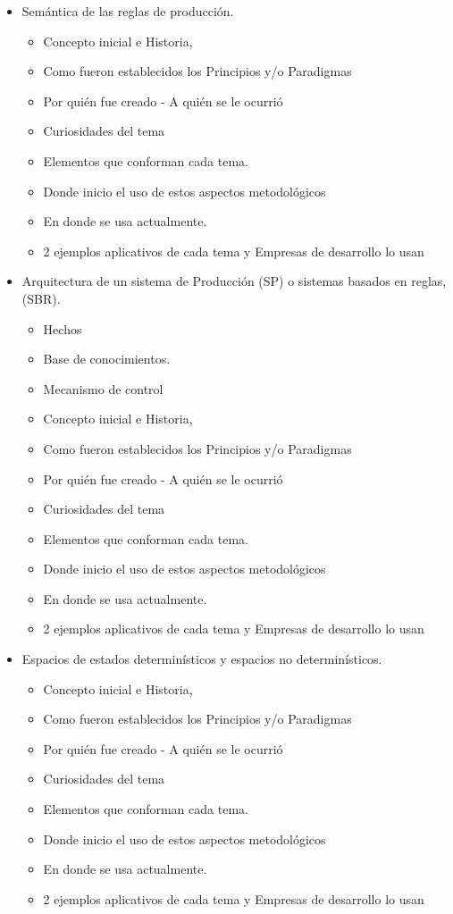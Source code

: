 \documentclass[12pt]{article}
\begin{document}
\begin{itemize}
	\item Semántica de las reglas de producción.
			\begin{itemize}
	   \item Concepto inicial e Historia,
	\item Como fueron establecidos los Principios y/o Paradigmas
	\item Por quién fue creado - A quién se le ocurrió
	\item Curiosidades del tema
	\item Elementos que conforman cada tema.
	\item Donde inicio el uso de estos aspectos metodológicos
	\item En donde se usa actualmente.
	\item 2 ejemplos aplicativos de cada tema y Empresas de desarrollo lo usan
	\end{itemize}
	
	\item Arquitectura de un sistema de Producción (SP) o sistemas basados en reglas, (SBR).
		\begin{itemize}
        \item Hechos
        \item Base de conocimientos.
        \item Mecanismo de control
           \item Concepto inicial e Historia,
	\item Como fueron establecidos los Principios y/o Paradigmas
	\item Por quién fue creado - A quién se le ocurrió
	\item Curiosidades del tema
	\item Elementos que conforman cada tema.
	\item Donde inicio el uso de estos aspectos metodológicos
	\item En donde se usa actualmente.
	\item 2 ejemplos aplicativos de cada tema y Empresas de desarrollo lo usan
   	 \end{itemize}
	
	\item Espacios de estados determinísticos y espacios no determinísticos.
			\begin{itemize}
	   \item Concepto inicial e Historia,
	\item Como fueron establecidos los Principios y/o Paradigmas
	\item Por quién fue creado - A quién se le ocurrió
	\item Curiosidades del tema
	\item Elementos que conforman cada tema.
	\item Donde inicio el uso de estos aspectos metodológicos
	\item En donde se usa actualmente.
	\item 2 ejemplos aplicativos de cada tema y Empresas de desarrollo lo usan
	\end{itemize}
	

\end{itemize}
\end{document}
